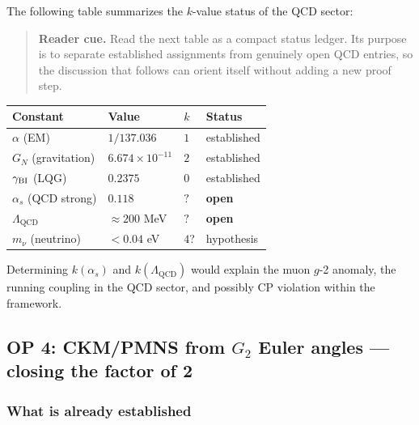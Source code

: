 \begin{remark}
\label{rem:k-qcd}
The following table summarizes the $k$-value status of the QCD sector:
\begin{quote}\small
\noindent\textbf{Reader cue.} Read the next table as a compact status ledger. Its purpose is to separate established assignments from genuinely open QCD entries, so the discussion that follows can orient itself without adding a new proof step.
\end{quote}
\begin{center}
\renewcommand{\arraystretch}{1.3}
\begin{tabular}{llll}
\toprule
Constant & Value & $k$ & Status \\
\midrule
$\alpha$ (EM) & $1/137.036$ & $1$ & established \\
$G_N$ (gravitation) & $6.674\times10^{-11}$ & $2$ & established \\
$\gamma_{\mathrm{BI}}$ (LQG) & $0.2375$ & $0$ & established \\
$\alpha_s$ (QCD strong) & $0.118$ & $?$ & \textbf{open} \\
$\Lambda_{\mathrm{QCD}}$ & $\approx 200$ MeV & $?$ & \textbf{open} \\
$m_\nu$ (neutrino) & $< 0.04$ eV & $4$? & hypothesis \\
\bottomrule
\end{tabular}
\end{center}
Determining $k(\alpha_s)$ and $k(\Lambda_{\mathrm{QCD}})$ would explain
the muon $g$-2 anomaly, the running coupling in the QCD sector, and
possibly CP violation within the framework.
\end{remark}





\subsection{OP 4: CKM/PMNS from \texorpdfstring{$G_2$}{G2}
 Euler angles — closing the factor of 2}
\label{sec:op4}

\subsubsection{What is already established}

